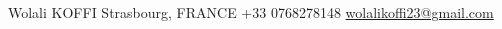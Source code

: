 \documentclass[lighthipster]{simplehipstercv}
\newlength{\rightcolwidth}
\begin{document}
\begin{paracol}{2}
\begin{minipage}[t]{0.3\textwidth}
\end{minipage}\hfill






\vfill{} %

\setlength{\parindent}{0pt}
\begin{minipage}[t]{\rightcolwidth}
\begin{center}\fontfamily{\sfdefault}\selectfont \color{black!70}
{\small Wolali KOFFI   Strasbourg, FRANCE  +33 0768278148 \newline{} \protect\url{wolalikoffi23@gmail.com}
}
\end{center}
\end{minipage}

\end{paracol}
\end{document}
